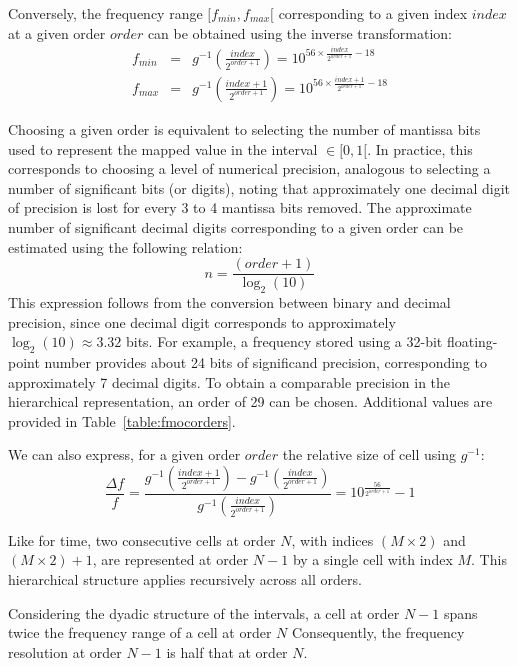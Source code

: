 \documentclass[11pt,a4paper]{ivoa}
\begin{document}
Conversely, the frequency range $[f_{min}, f_{max}[$ corresponding to a given
index $index$ at a given order $order$ can be obtained using the inverse
transformation:
\begin{eqnarray*}
  f_{min}       & = & g^{-1}(\frac{index}{2^{order + 1}})     = 10^{ 56 \times \frac{index}{2^{order + 1}} - 18} \\
  f_{max}       & = & g^{-1}(\frac{index + 1}{2^{order + 1}}) = 10^{ 56 \times \frac{index + 1}{2^{order + 1}} - 18}	
\end{eqnarray*}

Choosing a given order is equivalent to selecting the number of mantissa bits
used to represent the mapped value in the interval $\in [0, 1[$.
In practice, this corresponds to choosing a level of numerical precision,
analogous to selecting a number of significant bits (or digits), noting that
approximately one decimal digit of precision is lost for every 3 to 4 mantissa
bits removed.
The approximate number of significant decimal digits corresponding to a given
order can be estimated using the following relation:
\begin{equation}
  n = \frac{(order + 1)}{\log_2(10)}
\end{equation}
This expression follows from the conversion between binary and decimal precision,
since one decimal digit corresponds to approximately $\log_2(10) \approx 3.32$ bits.
For example, a frequency stored using a 32-bit floating-point number provides about
24 bits of significand precision, corresponding to approximately 7 decimal digits.
To obtain a comparable precision in the hierarchical representation, an order of 29 can be chosen.
Additional values are provided in Table~\ref{table:fmocorders}.

We can also express, for a given order $order$ the relative size of cell using $g^{-1}$:
\begin{equation}
    \frac{\Delta f}{f} = \frac{g^{-1}(\frac{index + 1}{2^{order + 1}}) - g^{-1}(\frac{index}{2^{order + 1}})}{g^{-1}(\frac{index}{2^{order + 1}})} = 10^\frac{56}{2^{order + 1}} - 1
\end{equation}



Like for time, two consecutive cells at order $N$, with indices
$(M\times 2)$ and $(M\times 2)+1$, are represented at order $N-1$
by a single cell with index $M$.
This hierarchical structure applies recursively across all orders.

Considering the dyadic structure of the intervals, a cell at order
$N-1$ spans twice the frequency range of a cell at order $N$
Consequently, the frequency resolution at order
$N-1$ is half that at order $N$.
\end{document}
